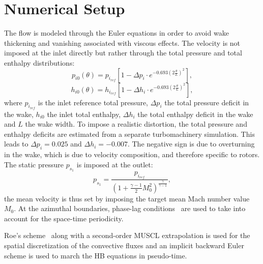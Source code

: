 \section{Numerical Setup}

The flow is modeled through the 
Euler equations in order to avoid wake thickening and vanishing
associated with viscous effects. 
The velocity is not imposed at the inlet directly
but rather through the total pressure and total enthalpy distributions:
\begin{equation}
  \label{eq:rotatingblocks_ptot}
    p_{i0} (\theta) = p_{i_{ref}} \left[1 - 
        \Delta p_i \cdot e^{
          -0.693 \left( 2 \frac{\theta}{L} \right) ^ 2}\right],
\end{equation}
\begin{equation}
  \label{eq:rotatingblocks_htot}
    h_{i0} (\theta) = h_{i_{ref}} \left[1- 
        \Delta h_i \cdot e^{
          -0.693 \left( 2 \frac{\theta}{L} \right) ^ 2}\right],
\end{equation}
where $p_{i_{ref}}$ is the inlet reference total pressure, $\Delta p_i$ the total pressure
deficit in the wake,
$h_{i0}$ the inlet total enthalpy, $\Delta h_i$ the total enthalpy
deficit in the wake and $L$ the wake width.
To impose a realistic distortion, the total pressure and
enthalpy deficits are estimated from a separate turbomachinery simulation.
This leads to $\Delta p_i = 0.025$ and 
$\Delta h_i = - 0.007$.
The negative sign is due to overturning in the wake, which
is due to velocity composition, and therefore specific to rotors.
The static pressure $p_{s_1}$ is imposed at the outlet:
\begin{equation}
    p_{s_1} = \frac{p_{i_{ref}}}{\left(1 + 
    \frac{\gamma - 1}{2} M_{0}^2 \right) ^ {\frac{\gamma}{ \gamma - 1}}} ,
\end{equation}
the mean velocity is thus set by imposing the
target mean Mach number value $M_{0}$.
At the azimuthal boundaries, phase-lag conditions~\cite{Erdos1977} 
are used to take into account for the space-time periodicity.

Roe's scheme~\cite{Roe1981} along with a second-order MUSCL extrapolation 
is used for the spatial discretization of
the convective fluxes and an implicit backward Euler scheme is used
to march the HB equations in pseudo-time.

